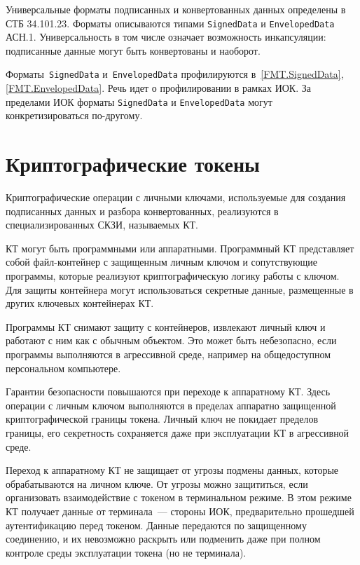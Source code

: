 Универсальные форматы подписанных и конвертованных данных определены в СТБ 
34.101.23. Форматы описываются типами  \texttt{SignedData} и 
\texttt{EnvelopedData} АСН.1.
%
Универсальность в том числе означает возможность инкапсуляции:
подписанные данные могут быть конвертованы и наоборот.

Форматы~\texttt{SignedData} и~\texttt{EnvelopedData} профилируются 
в~\ref{FMT.SignedData}, \ref{FMT.EnvelopedData}.  
Речь идет о профилировании в рамках ИОК. За пределами ИОК форматы
\texttt{SignedData} и \texttt{EnvelopedData} могут конкретизироваться 
по-другому. 

\section{Криптографические токены}\label{COMMON.CT}

Криптографические операции с личными ключами, используемые для создания 
подписанных данных и разбора конвертованных, реализуются в 
специализированных СКЗИ, называемых КТ.
                                        
КТ могут быть программными или аппаратными.
Программный КТ представляет собой файл-контейнер с защищенным личным 
ключом и сопутствующие программы, которые реализуют криптографическую 
логику работы с ключом. Для защиты контейнера могут использоваться 
секретные данные, размещенные в других ключевых контейнерах КТ.

Программы КТ снимают защиту с контейнеров, извлекают личный ключ и 
работают с ним как с обычным объектом. Это может быть небезопасно, если
программы выполняются в агрессивной среде, например на общедоступном 
персональном компьютере. 

Гарантии безопасности повышаются при переходе к аппаратному КТ.
Здесь операции с личным ключом выполняются в пределах аппаратно защищенной 
криптографической границы токена. Личный ключ не покидает пределов границы,
его секретность сохраняется даже при эксплуатации КТ в агрессивной среде.

Переход к аппаратному КТ не защищает от угрозы подмены данных,
которые обрабатываются на личном ключе. От угрозы можно защититься,
если организовать взаимодействие с токеном в терминальном режиме.
В этом режиме КТ получает данные от терминала~--- стороны ИОК, 
предварительно прошедшей аутентификацию перед токеном. Данные передаются 
по защищенному соединению, и их невозможно раскрыть или подменить
даже при полном контроле среды эксплуатации токена (но не терминала).

